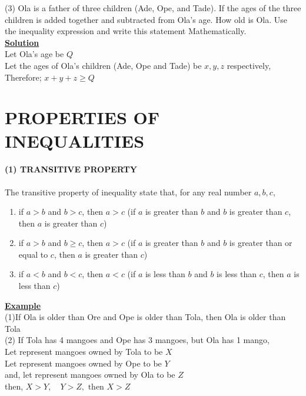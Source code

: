 \documentclass[12pt]{report}
\newcommand{\ubt}[1]{\textbf{\underline{#1}}}
\newcommand{\spn}[1]{\\[#1cm]}
\newcommand{\NI}{\noindent}
\begin{document}
	\NI(3) Ola is a father of three children (Ade, Ope, and Tade). If the ages of the three children is added together and subtracted from Ola's age. How old is Ola. Use the inequality expression and write this statement Mathematically.\spn{-.6}
		
	\NI\ubt{Solution}\\
	Let Ola's age be $Q$\\
	Let the ages of Ola's children (Ade, Ope and Tade) be $x, y, z$ respectively,\\
	Therefore; $x + y + z \geq Q$\\
	
	
	
	\chapter{PROPERTIES OF INEQUALITIES}
	
	\subsubsection{(1) TRANSITIVE PROPERTY}
	The transitive property of inequality state that, for any real number $a,b,c,$
	\begin{enumerate}
		\item if $a > b$ and $b>c$, then $a > c$ (if $a$ is greater than $b$ and $b$ is greater than $c$, then $a$ is greater than $c$)
		
		\item if $a>b$ and $b \geq c$, then $a>c$ (if $a$ is greater than $b$ and $b$ is greater than or equal to $c$, then $a$ is greater than $c$)
		
		\item if $a < b$ and $b<c$, then $a<c$ (if $a$ is less than $b$ and $b$ is less than $c$, then $a$ is less than $c$)
	\end{enumerate}
	\newpage
	\ubt{Example}\\
	(1)If Ola is older than Ore and Ope is older than Tola, then Ola is older than Tola\\
	(2) If Tola has 4 mangoes and Ope has 3 mangoes, but Ola has 1 mango,\\
	Let represent mangoes owned by Tola to be $X$\\
	Let represent mangoes owned by Ope to be $Y$\\
	and, let represent mangoes owned by Ola to be $Z$\\
	then, $X>Y, \quad Y>Z, \text{ then } X >Z$\\
	
\end{document}
